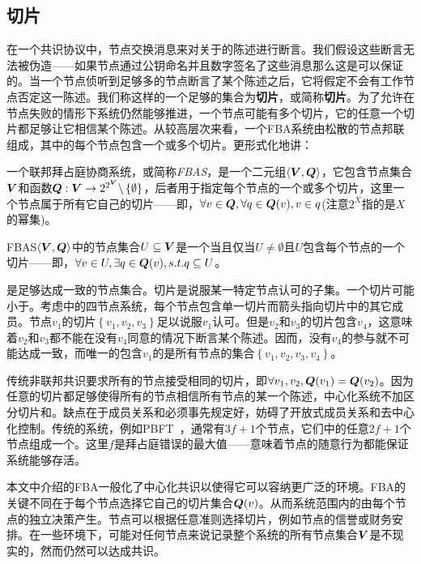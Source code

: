 \subsection{{\quorum}切片}

在一个共识协议中，节点交换消息来对关于{\slot}的陈述进行断言。我们假设这些断言无法被伪造——如果节点通过公钥命名并且数字签名了这些消息那么这是可以保证的。当一个节点侦听到足够多的节点断言了某个陈述之后，它将假定不会有工作节点否定这一陈述。我们称这样的一个足够的集合为\textbf{{\quorum}切片}，或简称\textbf{切片}。为了允许在节点失败的情形下系统仍然能够推进，一个节点可能有多个切片，它的任意一个切片都足够让它相信某个陈述。从较高层次来看，一个FBA系统由松散的节点邦联组成，其中的每个节点包含一个或多个切片。更形式化地讲：

\begin{definition}[FBAS]
	一个联邦拜占庭协商系统，或简称\textit{FBAS}，是一个二元组$\langle{\bm V}, {\bm Q}\rangle$，它包含节点集合${\bm V}$和{\quorum}函数${\bm Q}:{\bm V}\rightarrow2^{2^{{\bm V}}}\backslash\left\{\emptyset\right\}$，后者用于指定每个节点的一个或多个切片，这里一个节点属于所有它自己的切片——即，$\forall v\in{\bm Q},\forall q\in{{\bm Q}(v)},v\in q$(注意$2^X$指的是$X$的幂集)。
\end{definition}

\begin{definition}[\quorum]
	FBAS$\langle{\bm V},{\bm Q}\rangle$中的节点集合$U\subseteq{\bm V}$是一个\textbf{\quorum}当且仅当$U\neq \emptyset$且$U$包含每个节点的一个切片——即，$\forall v\in U, \exists q \in {\bm Q}(v), s.t. q\subseteq U$。
\end{definition}

{\quorum}是足够达成一致的节点集合。切片是说服某一特定节点认可的{\quorum}子集。一个{\quorum}切片可能小于{\quorum}。考虑中的四节点系统，每个节点包含单一切片而箭头指向切片中的其它成员。节点$v_1$的切片$\left\{v_1,v_2,v_3\right\}$足以说服$v_1$认可。但是$v_2$和$v_3$的切片包含$v_4$，这意味着$v_2$和$v_3$都不能在没有$v_4$同意的情况下断言某个陈述。因而，没有$v_4$的参与就不可能达成一致，而唯一的包含$v_1$的{\quorum}是所有节点的集合$\left\{v_1,v_2,v_3,v_4\right\}$。

传统非联邦共识要求所有的节点接受相同的切片，即$\forall v_1, v_2, {\bm Q}(v_1)={\bm Q}(v_2)$。因为任意的切片都足够使得所有的节点相信所有节点的某一个陈述，中心化系统不加区分切片和{\quorum}。缺点在于成员关系和{\quorum}必须事先规定好，妨碍了开放式成员关系和去中心化控制。传统的系统，例如PBFT~\cite{Castro:1999:PBFT}，通常有$3f+1$个节点，它们中的任意$2f+1$个节点组成一个{\quorum}。这里$f$是拜占庭错误的最大值——意味着节点的随意行为都能保证系统能够存活。

本文中介绍的FBA一般化了中心化共识以使得它可以容纳更广泛的环境。FBA的关键不同在于每个节点选择它自己的{\quorum}切片集合${\bm Q}(v)$。从而系统范围内的{\quorum}由每个节点的独立决策产生。节点可以根据任意准则选择切片，例如节点的信誉或财务安排。在一些环境下，可能对任何节点来说记录整个系统的所有节点集合${{\bm V}}$是不现实的，然而仍然可以达成共识。